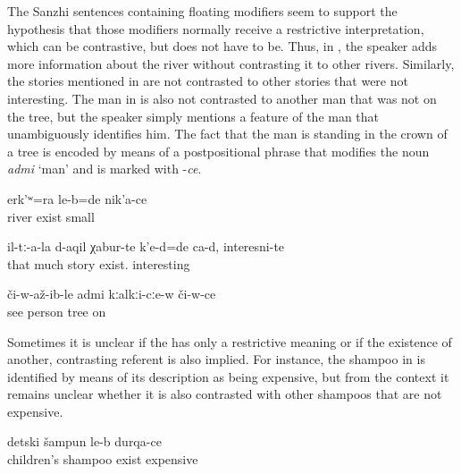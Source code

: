 The Sanzhi sentences containing floating modifiers seem to support the hypothesis that those modifiers normally receive a restrictive interpretation, which can be contrastive, but does not have to be. Thus, in , the speaker adds more information about the river without contrasting it to other rivers. Similarly, the stories mentioned in  are not contrasted to other stories that were not interesting. The man in  is also not contrasted to another man that was not on the tree, but the speaker simply mentions a feature of the man that unambiguously identifies him. The fact that the man is standing in the crown of a tree is encoded by means of a postpositional phrase that modifies the noun \textit{admi} `man' and is marked with -\textit{ce}.

\begin{exe}
	\ex	\label{ex:‎There was also a river there that was small}
	\gll	erk'ʷ=ra	le-b=de	nik'a-ce\\
		river	exist	small\\
	\glt	{}

	\ex	\label{ex:About them there were, are many stories, interesting@19c}
	\gll	il-tː-a-la	d-aqil	χabur-te	k'e-d=de	ca-d,	{} interesni-te\\
		that	much	story	exist.		{} interesting\\
	\glt	{}

	\ex	\label{ex:and then (he) saw the man on the tree@19c}
	\gll	či-w-až-ib-le admi	kːalkːi-cːe-w	či-w-ce\\
		see	person	tree	on\\
	\glt	{}
\end{exe}

Sometimes it is unclear if the  has only a restrictive meaning or if the existence of another, contrasting referent is also implied. For instance, the shampoo in  is identified by means of its description as being expensive, but from the context it remains unclear whether it is also contrasted with other shampoos that are not expensive.
%
\begin{exe}

		\ex	\label{ex:There is shampoo for children, expensive@19c}
		\gll	detski	šampun	le-b	durqa-ce\\
			children's	shampoo	exist	expensive\\
		\glt	{}
\end{exe}


